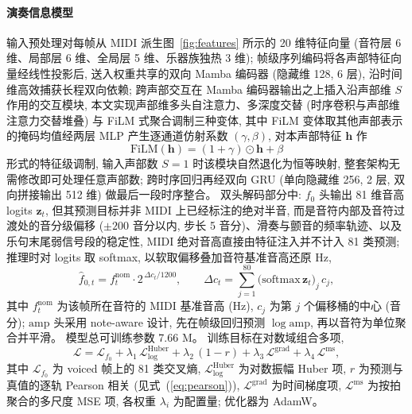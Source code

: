 \documentclass[a4paper, UTF8, zihao=-4, fontset=fandol]{ctexart}
\begin{document}
\paragraph{演奏信息模型}\quad
输入预处理对每帧从 MIDI 派生图~\ref{fig:features} 所示的 20 维特征向量 (音符层 6 维、局部层 6 维、全局层 5 维、乐器族独热 3 维); 帧级序列编码将各声部特征向量经线性投影后, 送入权重共享的双向 Mamba 编码器 (隐藏维 128, 6 层), 沿时间维高效捕获长程双向依赖; 跨声部交互在 Mamba 编码器输出之上插入沿声部维 $S$ 作用的交互模块, 本文实现声部维多头自注意力、多深度交替 (时序卷积与声部维注意力交替堆叠) 与 FiLM 式聚合调制三种变体, 其中 FiLM 变体取其他声部表示的掩码均值经两层 MLP 产生逐通道仿射系数 $(\gamma, \beta)$, 对本声部特征 $\mathbf{h}$ 作
\begin{equation}\label{eq:film}
\mathrm{FiLM}(\mathbf{h}) = (1 + \gamma) \odot \mathbf{h} + \beta
\end{equation}
形式的特征级调制, 输入声部数 $S = 1$ 时该模块自然退化为恒等映射, 整套架构无需修改即可处理任意声部数; 跨时序回归再经双向 GRU (单向隐藏维 256, 2 层, 双向拼接输出 512 维) 做最后一段时序整合。 双头解码部分中: $f_0$ 头输出 81 维音高 logits $\mathbf{z}_t$, 但其预测目标并非 MIDI 上已经标注的绝对半音, 而是音符内部及音符过渡处的音分级偏移 ($\pm 200$ 音分以内, 步长 5 音分)、滑奏与颤音的频率轨迹、以及乐句末尾弱信号段的稳定性, MIDI 绝对音高直接由特征注入并不计入 81 类预测; 推理时对 logits 取 softmax, 以软取偏移叠加音符基准音高还原 Hz,
\begin{equation}\label{eq:f0rec}
\hat f_{0,t} = f^{\text{nom}}_t \cdot 2^{\,\Delta c_t / 1200}, \qquad \Delta c_t = \sum_{j=1}^{80} \big(\mathrm{softmax}\,\mathbf{z}_t\big)_j \, c_j,
\end{equation}
其中 $f^{\text{nom}}_t$ 为该帧所在音符的 MIDI 基准音高 (Hz), $c_j$ 为第 $j$ 个偏移桶的中心 (音分); $\mathrm{amp}$ 头采用 note-aware 设计, 先在帧级回归预测 $\log \mathrm{amp}$, 再以音符为单位聚合并平滑。 模型总可训练参数 7.66 M。 训练目标在对数域组合多项,
\begin{equation}\label{eq:loss}
\mathcal{L} = \mathcal{L}_{f_0} + \lambda_1 \, \mathcal{L}^{\text{Huber}}_{\log} + \lambda_2 \, (1 - r) + \lambda_3 \, \mathcal{L}^{\text{grad}} + \lambda_4 \, \mathcal{L}^{\text{ms}},
\end{equation}
其中 $\mathcal{L}_{f_0}$ 为 voiced 帧上的 81 类交叉熵, $\mathcal{L}^{\text{Huber}}_{\log}$ 为对数振幅 Huber 项, $r$ 为预测与真值的逐轨 Pearson 相关 (见式~(\ref{eq:pearson})), $\mathcal{L}^{\text{grad}}$ 为时间梯度项, $\mathcal{L}^{\text{ms}}$ 为按拍聚合的多尺度 MSE 项, 各权重 $\lambda_i$ 为配置量; 优化器为 AdamW。
\end{document}
